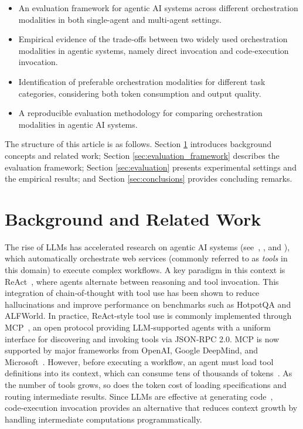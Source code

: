 \documentclass[runningheads]{llncs}
\begin{document}
\begin{itemize}

\item An evaluation framework for agentic AI systems across different orchestration modalities in both single-agent and multi-agent settings.

\item Empirical evidence of the trade‑offs between two widely used orchestration modalities in agentic systems, namely direct invocation and code‑execution invocation.

\item Identification of preferable orchestration modalities for different task categories, considering both token consumption and output quality.

\item A reproducible evaluation methodology for comparing orchestration modalities in agentic AI systems.
\end{itemize}

The structure of this article is as follows. Section \ref{sec:background} introduces background concepts and related work; Section \ref{sec:evaluation_framework} describes the evaluation framework; Section \ref{sec:evaluation} presents experimental settings and the empirical results; and Section \ref{sec:conclusions} provides concluding remarks.



\section{Background and Related Work}
\label{sec:background}

The rise of LLMs has accelerated research on agentic AI systems (see~\cite{raheem2025agentic}, \cite{dwivedi2026agentic}, and \cite{acharya2025agentic}), which automatically orchestrate web services (commonly referred to as \textit{tools} in this domain) to execute complex workflows. A key paradigm in this context is ReAct~\cite{yao2022react}, where agents alternate between reasoning and tool invocation. This integration of chain‑of‑thought with tool use has been shown to reduce hallucinations and improve performance on benchmarks such as HotpotQA and ALFWorld. In practice, ReAct-style tool use is commonly implemented through MCP~\cite{mcp_intro_2024}, an open protocol providing LLM‑supported agents with a uniform interface for discovering and invoking tools via JSON‑RPC 2.0. MCP is now supported by major frameworks from OpenAI, Google DeepMind, and Microsoft~\cite{hou2025model}.
However, before executing a workflow, an agent must load tool definitions into its context, which can consume tens of thousands of tokens~\cite{anthropic_advanced_tool_use_2025}. As the number of tools grows, so does the token cost of loading specifications and routing intermediate results. Since LLMs are effective at generating code~\cite{joel2024survey}, code‑execution invocation provides an alternative that reduces context growth by handling intermediate computations programmatically.
\end{document}
